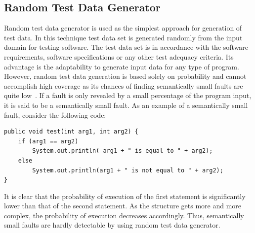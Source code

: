 

\subsection{Random Test Data Generator}
\label{sec:randomgenerator_2}
Random test data generator is used as the simplest approach for generation of test data. In this technique test data set is generated randomly from the input domain for testing software. The test data set is in accordance with the software requirements, software specifications or any other test adequacy criteria. Its advantage is the adaptability to generate input data for any type of program. However, random test data generation is based solely on probability and cannot accomplish high coverage as its chances of finding semantically small faults are quite low~\cite{godefroid2005dart}. If a fault is only revealed by a small percentage of the program input, it is said to be a semantically small fault. As an example of a semantically small fault, consider the following code:
\bigskip
\begin{lstlisting}
public void test(int arg1, int arg2) {
    if (arg1 == arg2)
        System.out.println( arg1 + " is equal to " + arg2);
    else 
        System.out.println(arg1 + " is not equal to " + arg2);
}
\end{lstlisting}
It is clear that the probability of execution of the first statement is significantly lower than that of the second statement. As the structure gets more and more complex, the probability of execution decreases accordingly. Thus, semantically small faults are hardly detectable by using random test data generator. 

